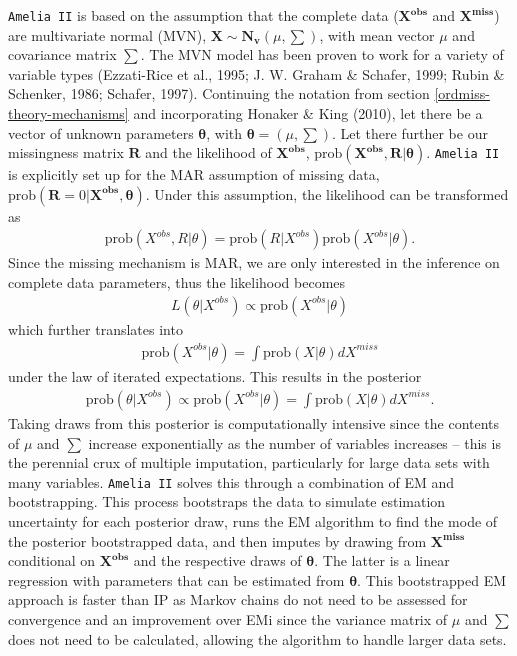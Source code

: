 \documentclass[12pt,econ]{sources/authesis}
\begin{document}
\texttt{Amelia\ II} is based on the assumption that the complete data (\(\bm{X^{obs}}\) and \(\bm{X^{miss}}\)) are multivariate normal (MVN), \(\bm{X} \sim \bm{N_v}(\mu, \sum)\), with mean vector \(\mu\) and covariance matrix \(\sum\). The MVN model has been proven to work for a variety of variable types (Ezzati-Rice et al., 1995; J. W. Graham \& Schafer, 1999; Rubin \& Schenker, 1986; Schafer, 1997). Continuing the notation from section \ref{ordmiss-theory-mechanisms} and incorporating Honaker \& King (2010), let there be a vector of unknown parameters \(\bm{\theta}\), with \(\bm{\theta} = (\mu, \sum)\). Let there further be our missingness matrix \(\bm{R}\) and the likelihood of \(\bm{X^{obs}}\), \(\text{prob}(\bm{X^{obs}}, \bm{R} | \bm{\theta})\). \texttt{Amelia\ II} is explicitly set up for the MAR assumption of missing data, \(\text{prob}(\bm{R} = 0 | \bm{X^{obs}}, \bm{\theta})\). Under this assumption, the likelihood can be transformed as
\begin{align}
\text{prob}(X^{obs}, R | \theta) = \text{prob}(R | X^{obs}) \text{prob}(X^{obs} | \theta).
\end{align}
Since the missing mechanism is MAR, we are only interested in the inference on complete data parameters, thus the likelihood becomes
\begin{align}
L(\theta | X^{obs}) \propto \text{prob}(X^{obs} | \theta)
\end{align}
which further translates into
\begin{align}
\text{prob}(X^{obs} | \theta) = \int \text{prob}(X | \theta) dX^{miss}
\end{align}
under the law of iterated expectations. This results in the posterior
\begin{align}
\text{prob}(\theta | X^{obs}) \propto \text{prob}(X^{obs} | \theta) = \int \text{prob}(X | \theta) dX^{miss}.
\end{align}
Taking draws from this posterior is computationally intensive since the contents of \(\mu\) and \(\sum\) increase exponentially as the number of variables increases -- this is the perennial crux of multiple imputation, particularly for large data sets with many variables. \texttt{Amelia\ II} solves this through a combination of EM and bootstrapping. This process bootstraps the data to simulate estimation uncertainty for each posterior draw, runs the EM algorithm to find the mode of the posterior bootstrapped data, and then imputes by drawing from \(\bm{X^{miss}}\) conditional on \(\bm{X^{obs}}\) and the respective draws of \(\bm{\theta}\). The latter is a linear regression with parameters that can be estimated from \(\bm{\theta}\). This bootstrapped EM approach is faster than IP as Markov chains do not need to be assessed for convergence and an improvement over EMi since the variance matrix of \(\mu\) and \(\sum\) does not need to be calculated, allowing the algorithm to handle larger data sets.
\end{document}
